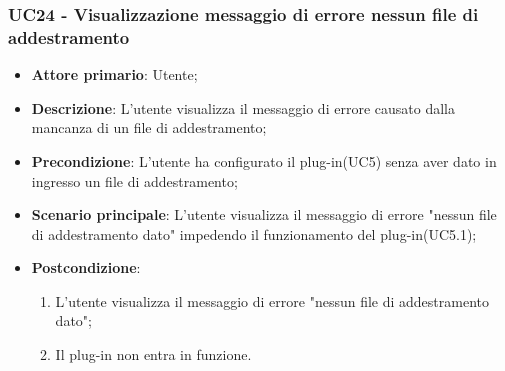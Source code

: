 \subsubsection{UC24 - Visualizzazione messaggio di errore nessun file di addestramento}
\label{sssec:uc24}
\begin{itemize}
  \item \textbf{Attore primario}: Utente;
  \item \textbf{Descrizione}: L'utente visualizza il messaggio di errore causato dalla mancanza di un file di addestramento;
  \item \textbf{Precondizione}: L'utente ha configurato il plug-in(UC5) senza aver dato in ingresso un file di addestramento;
  \item \textbf{Scenario principale}: L'utente visualizza il messaggio di errore "nessun file di addestramento dato" impedendo il funzionamento del plug-in(UC5.1);
  \item \textbf{Postcondizione}:
  \begin{enumerate}
		\item L'utente visualizza il messaggio di errore "nessun file di addestramento dato";
		\item Il plug-in non entra in funzione.
	\end{enumerate}
\end{itemize}
